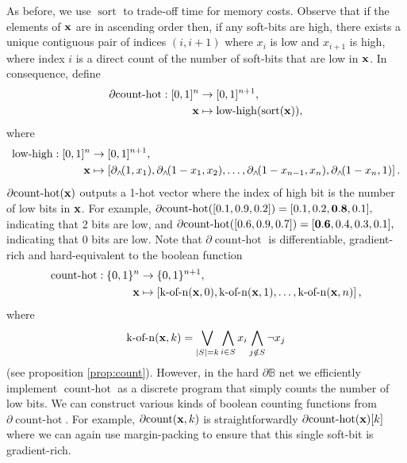 \documentclass{article} %
\begin{document}
As before, we use $\operatorname{sort}$ to trade-off time for memory costs. Observe that if the elements of ${\bf x}$ are in ascending order then, if any soft-bits are high, there exists a unique contiguous pair of indices $(i,i+1)$ where $x_{i}$ is low and $x_{i+1}$ is high, where index $i$ is a direct count of the number of soft-bits that are low in ${\bf x}$. In consequence, define
\begin{equation*}
\begin{aligned}
\partial\!\operatorname{count-hot}: [0,1]^{n} &\to [0,1]^{n+1}, \\
{\bf x} &\mapsto \operatorname{low-high}(\operatorname{sort}({\bf x}))\text{,}
\end{aligned}
\end{equation*}
where 
\begin{equation*}
\begin{aligned}
\operatorname{low-high}: [0,1]^{n} &\to [0,1]^{n+1},\\
{\bf x} &\mapsto \left[ \partial_{\wedge}\!(1, x_{1}), \partial_{\wedge}\!(1 - x_{1}, x_{2}), \dots, \partial_{\wedge}\!(1 - x_{n-1}, x_{n}), \partial_{\wedge}\!(1-x_{n}, 1) \right]\text{.}
\end{aligned}
\end{equation*}
$\partial\!\operatorname{count-hot}({\bf x})$ outputs a 1-hot vector where the index of high bit is the number of low bits in ${\bf x}$. For example, $\partial\!\operatorname{count-hot}([0.1, 0.9, 0.2]) = [0.1, 0.2, \bold{0.8}, 0.1]\text{,}$ indicating that 2 bits are low, and $\partial\!\operatorname{count-hot}([0.6, 0.9, 0.7]) = [\bold{0.6}, 0.4, 0.3, 0.1]\text{,}$ indicating that 0 bits are low. Note that $\partial\!\operatorname{count-hot}$ is differentiable, gradient-rich and hard-equivalent to the boolean function
\begin{equation*}
\begin{aligned}
\operatorname{count-hot}: \{0,1\}^{n} &\to \{0,1\}^{n+1}, \\
{\bf x} &\mapsto \left[\operatorname{k-of-n}({\bf x}, 0), \operatorname{k-of-n}({\bf x}, 1), \dots, \operatorname{k-of-n}({\bf x}, n)\right]\text{,}
\end{aligned}
\end{equation*}
where
\begin{equation*}
\operatorname{k-of-n}({\bf x}, k) = \bigvee_{|S|=k} \bigwedge_{i\in S} x_i \bigwedge_{j\notin S} \neg x_j
\end{equation*}
(see proposition \ref{prop:count}). However, in the hard $\partial\mathbb{B}$ net we efficiently implement $\operatorname{count-hot}$ as a discrete program that simply counts the number of low bits. We can construct various kinds of boolean counting functions from $\partial\!\operatorname{count-hot}$. For example, $\partial\!\operatorname{count}({\bf x}, k)$ is straightforwardly $\partial\!\operatorname{count-hot}({\bf x})[k]$ where we can again use margin-packing to ensure that this single soft-bit is gradient-rich.
\end{document}

